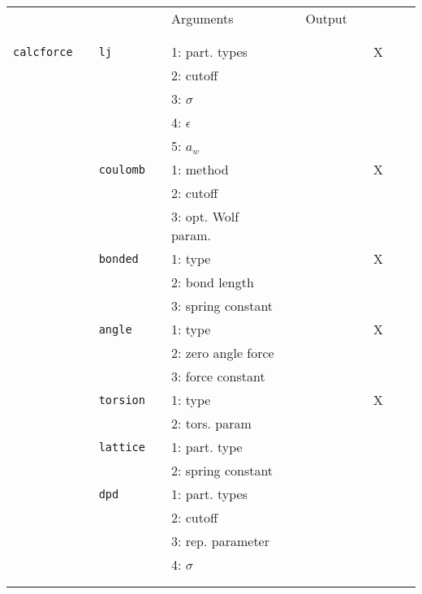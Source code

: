 \documentclass[11pt]{article}
\begin{document}
\begin{center}
  
  \begin{tabular}{cclclclllcc}
	  {\color{red}{\textbf{Action}}} && {\color{blue}{Specifier}} && Arguments && Output && \rotatebox{90}{CUDA}\\
								   && && && && \\
    \hline
	  && && && && \\
	  \verb!calcforce! && \verb!lj! && 1: part. types && && X\\
								   && && 2: cutoff&& && \\
								   && && 3: $\sigma$ && && \\
								   && && 4: $\epsilon$ && && \\
								   && && 5: $a_w$ && && \\
				   &&\verb!coulomb!&& 1: method && && X \\
				   &&              && 2: cutoff && &&  \\
					&&             && 3: opt. Wolf param. && && \\
					&& \verb!bonded! && 1: type && && X \\  
					&&             && 2: bond length && && \\
					&&             && 3: spring constant && && \\
					&& \verb!angle!&& 1: type && && X\\  
					&&             && 2: zero angle force && && \\
					&&             && 3: force constant && && \\            
					&& \verb!torsion! && 1: type && && X \\  
					&&             && 2: tors. param && && \\
					&& \verb!lattice! && 1: part. type && && \\
					&&               && 2: spring constant && && \\   
					&& \verb!dpd! && 1: part. types && && \\
					&&            && 2: cutoff && && \\  
					&&            && 3: rep. parameter && && \\ 
					&&            && 4: $\sigma$ && && \\
								   && && && && \\
    \hline
	  && && && &&
  \end{tabular}

\end{center}
\end{document}
